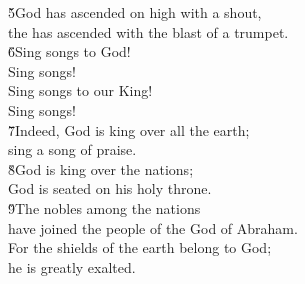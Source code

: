 \begin{poetry}
\poeml \v{5}God has ascended on high with a shout, \\
\poemll    the  has ascended with the blast of a trumpet. \\
\poeml \v{6}Sing songs to God! \\
\poemll    Sing songs! \\
\poeml Sing songs to our King! \\
\poemll    Sing songs! \\
\poeml \v{7}Indeed, God is king over all the earth; \\
\poemll    sing a song of praise. \\
\poeml \v{8}God is king over the nations; \\
\poemll    God is seated on his holy throne. \\
\poeml \v{9}The nobles among the nations \\
\poemll    have joined the people of the God of Abraham. \\
\poeml For the shields of the earth belong to God; \\
\poemll    he is greatly exalted.
\end{poetry}

